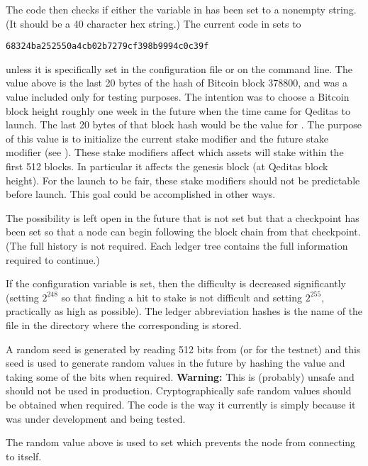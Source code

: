 The code then checks if either the {} variable in {}
has been set to a nonempty string. (It should be a 40 character hex string.)
The current code in {} sets {} to
\begin{verbatim}
68324ba252550a4cb02b7279cf398b9994c0c39f
\end{verbatim}
unless it is specifically set in the configuration file or on the command line.
The value above is the last 20 bytes of the hash of Bitcoin block 378800,
and was a value included only for testing purposes.
The intention was to choose a Bitcoin block height roughly one week in the future
when the time came for Qeditas to launch. The last 20 bytes of that block hash would
be the value for {}. The purpose of this value is to initialize the
current stake modifier and the future stake modifier (see {}).
These stake modifiers affect which assets will stake within the first 512 blocks.
In particular it affects the genesis block (at Qeditas block height).
For the launch to be fair, these stake modifiers should not be predictable before launch.
This goal could be accomplished in other ways.

The possibility is left open in the future that {} is not set but
that a checkpoint has been set so that a node can begin following the block chain
from that checkpoint. (The full history is not required. Each ledger tree contains
the full information required to continue.)

If the {} configuration variable is set, then the difficulty is decreased significantly
(setting {} $2^{248}$ so that finding a hit to stake is not difficult
and setting {} $2^{255}$, practically as high as possible).
The ledger abbreviation hashes is the name of the file %
in the {} directory
where the corresponding {} is stored.

A random seed is generated by reading 512 bits from {} (or {} for the testnet)
and this seed is used to generate random values in the future by hashing the value and taking
some of the bits when required.
{\bf{Warning:}} This is (probably) unsafe and should not be used in production.
Cryptographically safe random values should be obtained when required.
The code is the way it currently is simply because it was under development and
being tested.

The random value above is used to set {} which prevents the node
from connecting to itself.

